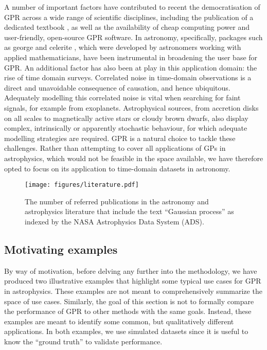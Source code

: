 \documentclass[letterpaper]{ar-1col}
\begin{document}
A number of important factors have contributed to recent the democratisation of GPR across a wide range of scientific disciplines, including the publication of a dedicated textbook \citep{gpml}, as well as the availability of cheap computing power and user-friendly, open-source GPR software. In astronomy, specifically, packages such as {\sc george} \citep{george} and {\sc celerite} \citep{celerite}, which were developed by astronomers working with applied mathematicians, have been instrumental in broadening the user base for GPR. An additional factor has also been at play in this application domain: the rise of time domain surveys. Correlated noise in time-domain observations is a direct and unavoidable consequence of causation, and hence ubiquitous. Adequately modelling this correlated noise is vital when searching for faint signals, for example from exoplanets. Astrophysical sources, from accretion disks on all scales to magnetically active stars or cloudy brown dwarfs, also display complex, intrinsically or apparently stochastic behaviour, for which adequate modelling strategies are required. GPR is a natural choice to tackle these challenges. Rather than attempting to cover all applications of GPs in astrophysics, which would not be feasible in the space available, we have therefore opted to focus on its application to time-domain datasets in astronomy.

\begin{figure}[ht]
  \centering
  \texttt{[image: figures/literature.pdf]}
  \caption{The number of referred publications in the astronomy and astrophysics literature that include the text ``Gaussian process'' as indexed by the NASA Astrophysics Data System (ADS). }
  \label{fig:literature}
\end{figure}

\subsection{Motivating examples}
\label{sec:sim_examples}

By way of motivation, before delving any further into the methodology, we have produced two illustrative examples that highlight some typical use cases for GPR in astrophysics.
These examples are not meant to comprehensively summarize the space of use cases.
Similarly, the goal of this section is not to formally compare the performance of GPR to other methods with the same goals.
Instead, these examples are meant to identify some common, but qualitatively different applications.
In both examples, we use simulated datasets since it is useful to know the ``ground truth'' to validate performance.
\end{document}
